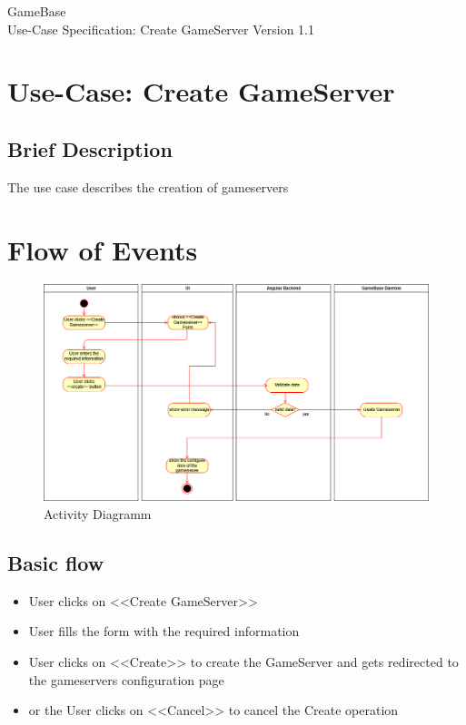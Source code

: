 \documentclass[a4paper,12pt,chapterprefix=false,bibliography=totoc,listof=totoc,book]{scrreprt}
\begin{document}
\begin{flushright}
GameBase
\\
Use-Case Specification: Create GameServer
\bigbreak
Version 1.1
\end{flushright}

\tableofcontents

\chapter{Use-Case: Create GameServer}

\section{Brief Description}
The use case describes the creation of gameservers

\chapter{Flow of Events}
\begin{figure}[H]
	\includegraphics[width=\textwidth]{diagramms/CreateGameserverActivityDiagramm.png}
	\caption{Activity Diagramm}
	\label{fig:ucd}
\end{figure}
\section{Basic flow}

\begin{itemize}
    \item User clicks on <<Create GameServer>>
    \item User fills the form with the required information
    \item User clicks on <<Create>> to create the GameServer and gets redirected to the gameservers configuration page
    \item or the User clicks on <<Cancel>> to cancel the Create operation
\end{itemize}
\end{document}
